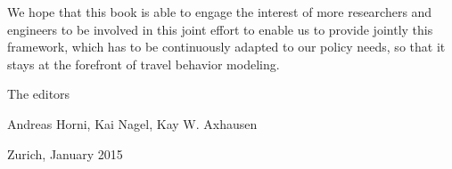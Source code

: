 We hope that this book is able to engage the interest of more researchers and engineers to be involved in this joint effort to enable us to provide jointly this framework, which has to be continuously adapted to our policy needs, so that it stays at the forefront of travel behavior modeling.

The editors

Andreas Horni, 	Kai Nagel,		Kay W. Axhausen

Zurich, January 2015

